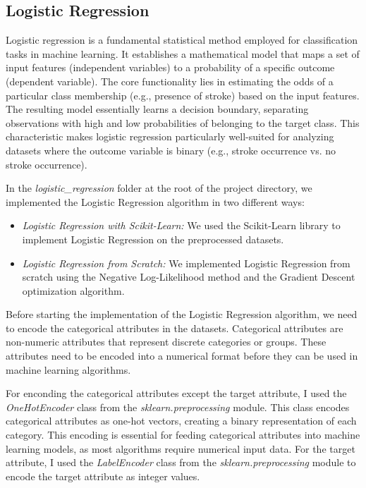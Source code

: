 \documentclass[runningheads]{paper}
\begin{document}
\subsection{Logistic Regression}
Logistic regression is a fundamental statistical method employed for classification 
tasks in machine learning. It establishes a mathematical model that maps a set
of input features (independent variables) to a probability of a specific outcome 
(dependent variable). The core functionality lies in estimating the odds of a 
particular class membership (e.g., presence of stroke) based on the input 
features. The resulting model essentially learns a decision boundary, 
separating observations with high and low probabilities of belonging to the 
target class. This characteristic makes logistic regression particularly 
well-suited for analyzing datasets where the outcome variable is binary 
(e.g., stroke occurrence vs. no stroke occurrence).

In the \textit{logistic\_regression} folder at the root of the project directory,
we implemented the Logistic Regression algorithm in two different ways:

\begin{itemize}
    \item \textit{Logistic Regression with Scikit-Learn:} We used the Scikit-Learn
    library to implement Logistic Regression on the preprocessed datasets.
    \item \textit{Logistic Regression from Scratch:} We implemented Logistic Regression
    from scratch using the Negative Log-Likelihood method and the Gradient Descent
    optimization algorithm.
\end{itemize}


Before starting the implementation of the Logistic Regression algorithm, we need to
encode the categorical attributes in the datasets. Categorical attributes are non-numeric
attributes that represent discrete categories or groups. These attributes need to be
encoded into a numerical format before they can be used in machine learning algorithms.

For enconding the categorical attributes except the target attribute, I used the
\textit{OneHotEncoder} class from the \textit{sklearn.preprocessing} module. This
class encodes categorical attributes as one-hot vectors, creating a binary representation
of each category. This encoding is essential for feeding categorical attributes into
machine learning models, as most algorithms require numerical input data. For the
target attribute, I used the \textit{LabelEncoder} class from the \textit{sklearn.preprocessing}
module to encode the target attribute as integer values.
\end{document}
